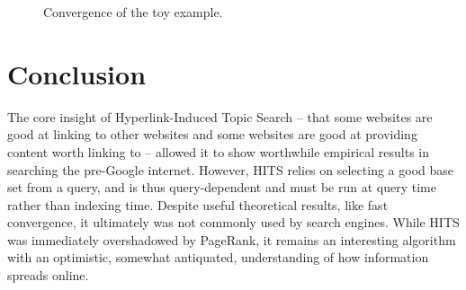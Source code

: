 \documentclass[11pt]{article}
\begin{document}
\begin{figure}
    \centering
    \caption{Convergence of the toy example.}
    \label{fig:hits-final}
\end{figure}

\section{Conclusion}
The core insight of Hyperlink-Induced Topic Search -- that some websites are good at linking to other websites and some websites are good at providing content worth linking to -- allowed it to show worthwhile empirical results in searching the pre-Google internet.
However, HITS relies on selecting a good base set from a query, and is thus query-dependent and must be run at query time rather than indexing time.
Despite useful theoretical results, like fast convergence, it ultimately was not commonly used by search engines.
While HITS was immediately overshadowed by PageRank, it remains an interesting algorithm with an optimistic, somewhat antiquated, understanding of how information spreads online.
\end{document}
